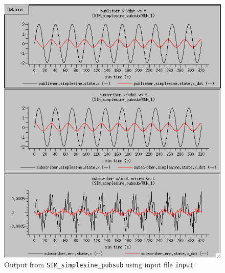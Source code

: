 \begin{figure}[b]
  \begin{center}
    \includegraphics[width=4.5in]{TrickHLAUser-prelim-SIM-pubsub-input.png}
  \end{center}
\caption{Output from {\tt SIM\_simplesine\_pubsub} using input file {\tt input}}
\label{fig:SIM-pubsub-input}
\end{figure}

%
%
\clearpage
